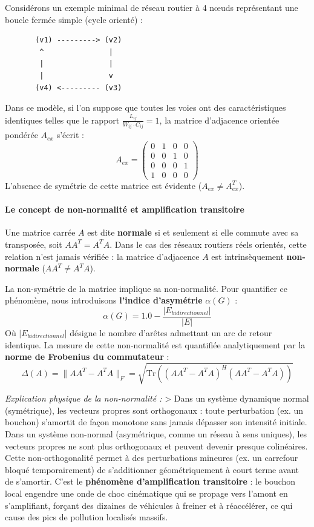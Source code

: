 \documentclass[10pt, a4paper]{article}
\begin{document}
Considérons un exemple minimal de réseau routier à 4 nœuds représentant
une boucle fermée simple (cycle orienté) :

\begin{verbatim}
       (v1) ---------> (v2)
        ^               |
        |               |
        |               v
       (v4) <--------- (v3)
\end{verbatim}

Dans ce modèle, si l'on suppose que toutes les voies ont des
caractéristiques identiques telles que le rapport
\(\frac{L_{ij}}{W_{ij} \cdot C_{ij}} = 1\), la matrice d'adjacence
orientée pondérée \(A_{ex}\) s'écrit : \[A_{ex} = \begin{pmatrix}
0 & 1 & 0 & 0 \\
0 & 0 & 1 & 0 \\
0 & 0 & 0 & 1 \\
1 & 0 & 0 & 0
\end{pmatrix}\] L'absence de symétrie de cette matrice est évidente
(\(A_{ex} \neq A_{ex}^T\)).

\paragraph{Le concept de non-normalité et amplification
transitoire}\label{le-concept-de-non-normalituxe9-et-amplification-transitoire}

Une matrice carrée \(A\) est dite \textbf{normale} si et seulement si
elle commute avec sa transposée, soit \(A A^T = A^T A\). Dans le cas des
réseaux routiers réels orientés, cette relation n'est jamais vérifiée :
la matrice d'adjacence \(A\) est intrinsèquement \textbf{non-normale}
(\(A A^T \neq A^T A\)).

La non-symétrie de la matrice implique sa non-normalité. Pour quantifier
ce phénomène, nous introduisons \textbf{l'indice d'asymétrie}
\(\alpha(G)\) : \[\alpha(G) = 1.0 - \frac{|E_{bidirectionnel}|}{|E|}\]
Où \(|E_{bidirectionnel}|\) désigne le nombre d'arêtes admettant un arc
de retour identique. La mesure de cette non-normalité est quantifiée
analytiquement par la \textbf{norme de Frobenius du commutateur} :
\[\Delta(A) = \| A A^T - A^T A \|_F = \sqrt{\text{Tr}\left( (A A^T - A^T A)^H (A A^T - A^T A) \right)}\]

\emph{Explication physique de la non-normalité :} \textgreater{} Dans un
système dynamique normal (symétrique), les vecteurs propres sont
orthogonaux : toute perturbation (ex. un bouchon) s'amortit de façon
monotone sans jamais dépasser son intensité initiale. Dans un système
non-normal (asymétrique, comme un réseau à sens uniques), les vecteurs
propres ne sont plus orthogonaux et peuvent devenir presque colinéaires.
Cette non-orthogonalité permet à des perturbations mineures (ex. un
carrefour bloqué temporairement) de s'additionner géométriquement à
court terme avant de s'amortir. C'est le \textbf{phénomène
d'amplification transitoire} : le bouchon local engendre une onde de
choc cinématique qui se propage vers l'amont en s'amplifiant, forçant
des dizaines de véhicules à freiner et à réaccélérer, ce qui cause des
pics de pollution localisés massifs.
\end{document}
